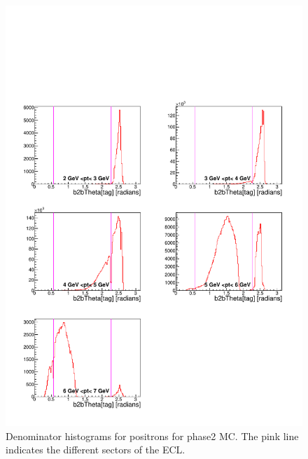\documentclass[a4paper,11pt,twosided,final,german,openbib,pdftex,listof=totoc,bibliography=totoc]{scrbook}
\begin{document}
\begin{appendix}
\begin{figure}[!htbp]
	\centering
	\includegraphics[width=\textwidth]{Plots/master/xPMThetaepD_MC}
	\caption[Momentum $\theta$ Positron Denominator Histogram Phase2 MC]{Denominator histograms for positrons for phase2 MC. The pink line indicates the different sectors of the ECL.}
	\label{plt:PMThetaepD_MC}
\end{figure}



\end{appendix}
\end{document}
